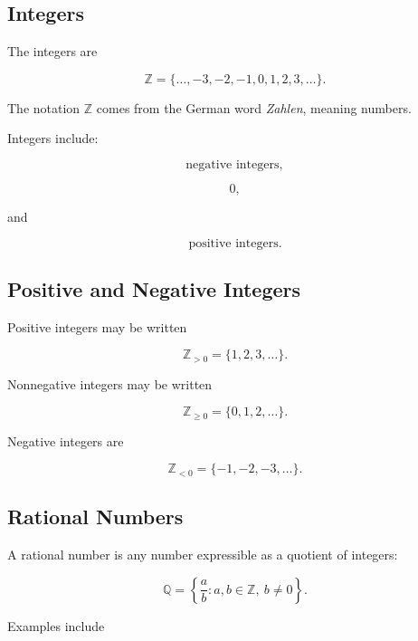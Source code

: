 \subsection{Integers}
\label{subsec:integers-reference}

The integers are

\[
\boxed{
\mathbb{Z}
=
\{\ldots,-3,-2,-1,0,1,2,3,\ldots\}.
}
\]

The notation \(\mathbb{Z}\) comes from the German word
\emph{Zahlen}, meaning numbers.

Integers include:

\[
\boxed{
\text{negative integers},
}
\]

\[
\boxed{
0,
}
\]

and

\[
\boxed{
\text{positive integers}.
}
\]

\subsection{Positive and Negative Integers}
\label{subsec:positive-negative-integers-reference}

Positive integers may be written

\[
\boxed{
\mathbb{Z}_{>0}
=
\{1,2,3,\ldots\}.
}
\]

Nonnegative integers may be written

\[
\boxed{
\mathbb{Z}_{\geq0}
=
\{0,1,2,\ldots\}.
}
\]

Negative integers are

\[
\boxed{
\mathbb{Z}_{<0}
=
\{-1,-2,-3,\ldots\}.
}
\]

\subsection{Rational Numbers}
\label{subsec:rational-numbers-reference}

A rational number is any number expressible as a quotient of integers:

\[
\boxed{
\mathbb{Q}
=
\left\{
\frac{a}{b}
:
a,b\in\mathbb{Z},
\ b\neq0
\right\}.
}
\]

Examples include

